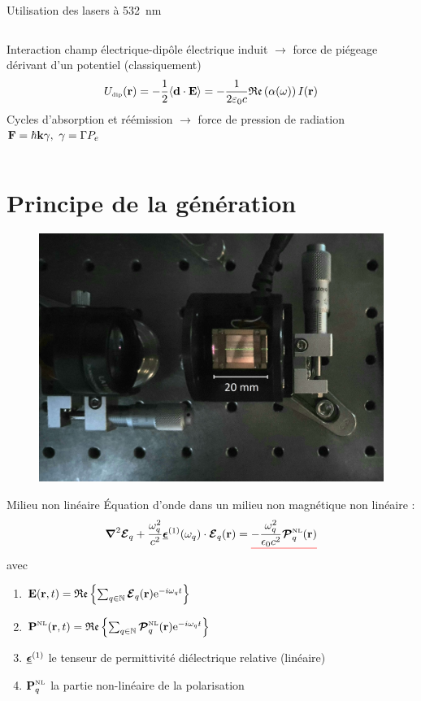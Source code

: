 \documentclass{beamer}
\begin{document}
\begin{frame}{Utilisation des lasers à 532~nm}
\begin{columns}
Interaction champ électrique-dipôle électrique induit
$\rightarrow$ force de piégeage dérivant d'un potentiel (classiquement)
\[U_\mathsc{dip}(\v r) = {-\frac12 \langle \v d \cdot \v E \rangle} = -\frac{1}{2\varepsilon_0 c}\mathfrak{Re}\left(\alpha(\omega)\right) I(\v r) \]
Cycles d'absorption et réémission $\rightarrow$ force de pression de radiation $\v F = \hbar \v k \gamma,\ \gamma = \Gamma P_e$
\centering

\end{columns}
\end{frame}

\section{Principe de la génération}

\begin{frame}
\begin{figure}[htbp]
  \centering
  \includegraphics[width=0.7\linewidth]{img/cristal clair.jpg}
\end{figure}
\end{frame}

\begin{frame}{Milieu non linéaire}
Équation d'onde dans un milieu non magnétique non linéaire :
\begin{equation*}
\boldsymbol{\nabla}^2 \boldsymbol{\E}_q + \frac{\omega_q^2}{c^2}\tens\epsilon^{(1)}(\omega_q)\cdot \v \E_q(\v r) = \uline{red}{ - \frac{\omega_q^2}{\epsilon_0 c^2} \boldsymbol{\mathcal{P}}^\mathsc{NL}_q(\v r) }
\end{equation*}
avec
\begin{enumerate}
\item[ ] $\v E(\v r, t) = \mathfrak{Re} \left\{ \sum_{q \in \mathbb N} \v {\boldsymbol{\mathcal E}}_q (\v r) \e{-i \omega_q t} \right\}$
\item[ ] $\v P^\mathsc{NL} (\v r, t) = \mathfrak{Re} \left\{ \sum_{q \in \mathbb N} \v {\boldsymbol{\mathcal P}}^\mathsc{NL}_q (\v r) \e{-i \omega_q t} \right\}$
\item[ ] $\tens \epsilon^{(1)}$ le tenseur de permittivité diélectrique relative (linéaire)
\item[ ] $\v P^\mathsc{NL}_q$ la partie non-linéaire de la polarisation
\end{enumerate}
\end{frame}
\end{document}
